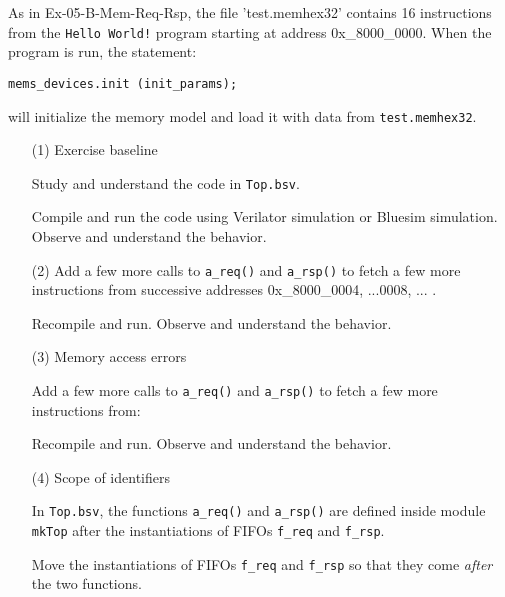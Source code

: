 As in Ex-05-B-Mem-Req-Rsp, the file 'test.memhex32' contains 16
instructions from the \verb|Hello World!| program starting at address
0x\_8000\_0000.  When the program is run, the statement:

{\footnotesize
\begin{Verbatim}[frame=single]
    mems_devices.init (init_params);
\end{Verbatim}
}

will initialize the memory model and load it with data from
\verb|test.memhex32|.

\begin{itemize}

\item[(1)] Exercise baseline

    Study and understand the code in \verb|Top.bsv|.

    Compile and run the code using Verilator simulation or Bluesim
    simulation.  Observe and understand the behavior.

\item[(2)] Add a few more calls to \verb|a_req()| and \verb|a_rsp()|
    to fetch a few more instructions from successive addresses
    0x\_8000\_0004, ...0008, ... {\etc}.

    Recompile and run.  Observe and understand the behavior.

\item[(3)] Memory access errors

    Add a few more calls to \verb|a_req()| and \verb|a_rsp()| to fetch
    a few more instructions from:


    Recompile and run. Observe and understand the behavior.

\item[(4)] Scope of identifiers

    In \verb|Top.bsv|, the functions \verb|a_req()| and \verb|a_rsp()|
    are defined inside module \verb|mkTop| after the instantiations of
    FIFOs \verb|f_req| and \verb|f_rsp|.

    Move the instantiations of FIFOs \verb|f_req| and \verb|f_rsp| so
    that they come \emph{after} the two functions.


\end{itemize}
